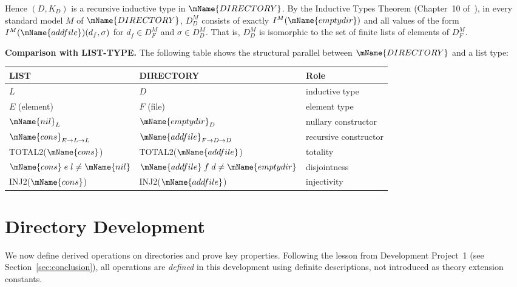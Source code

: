 \documentclass[11pt]{article}
\newcommand{\DIR}{\mName{DIRECTORY}}
\begin{document}
Hence $(D, K_D)$ is a recursive inductive type in $\DIR$.
By the Inductive Types Theorem (Chapter~10 of~\cite{farmer2025}),
in every standard model $M$ of $\DIR$, $D_D^M$ consists of exactly
$I^M(\mName{emptydir})$ and all values of the form
$I^M(\mName{addfile})(d_f, \sigma)$ for $d_f \in D_F^M$ and
$\sigma \in D_D^M$.  That is, $D_D^M$ is isomorphic to the set of
finite lists of elements of $D_F^M$.

\medskip
\noindent\textbf{Comparison with LIST-TYPE.}
The following table shows the structural parallel between
$\DIR$ and a list type:

\medskip
\begin{center}
\begin{tabular}{lll}
  \textbf{LIST} & \textbf{DIRECTORY} & \textbf{Role} \\
  \hline
  $L$ & $D$ & inductive type \\
  $E$ (element) & $F$ (file) & element type \\
  $\mName{nil}_L$ & $\mName{emptydir}_D$ & nullary constructor \\
  $\mName{cons}_{E \to L \to L}$ & $\mName{addfile}_{F \to D \to D}$ &
    recursive constructor \\
  TOTAL2($\mName{cons}$) & TOTAL2($\mName{addfile}$) & totality \\
  $\mName{cons}\;e\;l \ne \mName{nil}$ & $\mName{addfile}\;f\;d \ne \mName{emptydir}$
    & disjointness \\
  INJ2($\mName{cons}$) & INJ2($\mName{addfile}$) & injectivity \\
\end{tabular}
\end{center}

\newpage
\section{Directory Development}
\label{sec:dir-dev}

We now define derived operations on directories and prove key
properties.  Following the lesson from Development Project~1
(see Section~\ref{sec:conclusion}), all operations are
\emph{defined} in this development using definite descriptions,
not introduced as theory extension constants.
\end{document}
